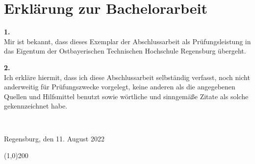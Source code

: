 \thispagestyle{empty}
\chapter*{Erklärung zur Bachelorarbeit}

\bigskip
\bigskip 
\bigskip 

\textbf{1.}\\[1ex]
    Mir ist bekannt, dass dieses Exemplar der Abschlussarbeit als Prüfungsleistung in das Eigentum der Ostbayerischen Technischen Hochschule Regensburg übergeht.

\textbf{2.}\\[1ex]
    Ich erkläre hiermit, dass ich diese Abschlussarbeit selbständig verfasst, noch nicht anderweitig für Prüfungszwecke vorgelegt, keine anderen als die angegebenen Quellen und Hilfsmittel benutzt sowie wörtliche und sinngemäße Zitate als solche gekennzeichnet habe.

\bigskip 
\bigskip 
\bigskip 
~\hfill\begin{minipage}{.5\textwidth}

Regensburg, den 11. August 2022

\bigskip 
\bigskip

\line(1,0){200}
\newline
\stud

\end{minipage}
